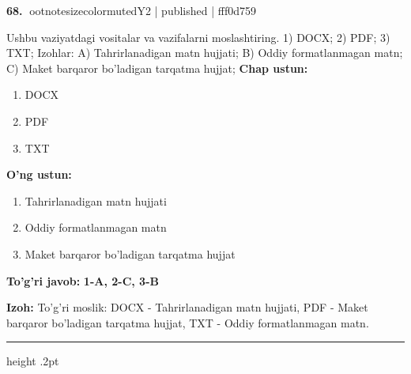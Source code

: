 \documentclass[10pt,a4paper]{article}
\begin{document}
\textbf{\color{ink}68.} {ootnotesizecolor{muted}Y2 | published | fff0d759}
\par
Ushbu vaziyatdagi vositalar va vazifalarni moslashtiring.  1) DOCX;  2) PDF;  3) TXT;  Izohlar: A) Tahrirlanadigan matn hujjati;  B) Oddiy formatlanmagan matn;  C) Maket barqaror bo'ladigan tarqatma hujjat;
\textbf{Chap ustun:}\begin{enumerate}[label=\arabic*),leftmargin=9mm]
\item DOCX
\item PDF
\item TXT
\end{enumerate}
\textbf{O'ng ustun:}\begin{enumerate}[label=\Alph*),leftmargin=9mm]
\item Tahrirlanadigan matn hujjati
\item Oddiy formatlanmagan matn
\item Maket barqaror bo'ladigan tarqatma hujjat
\end{enumerate}
\begin{tcolorbox}[enhanced,breakable,colback=teal!4,colframe=teal!55!black,boxrule=0.45pt,arc=1.2mm,left=2.8mm,right=2.8mm,top=2mm,bottom=2mm]
\textbf{\color{teal}To'g'ri javob:} \textbf{1-A, 2-C, 3-B}
\par\smallskip
\textbf{Izoh:} To'g'ri moslik: DOCX - Tahrirlanadigan matn hujjati, PDF - Maket barqaror bo'ladigan tarqatma hujjat, TXT - Oddiy formatlanmagan matn.
\end{tcolorbox}
\vspace{2mm}\hrule height .2pt\vspace{2mm}
\end{document}
